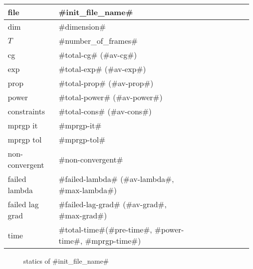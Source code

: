 \begin{center}
  \begin{tabular}{|l*{8}{|l}}
    \hline
	file & #init_file_name# \\ \hline
	dim & #dimension# \\ \hline
	$T$ & #number_of_frames# \\ \hline
	cg & #total-cg# (#av-cg#) \\ \hline
	exp & #total-exp# (#av-exp#) \\ \hline
	prop & #total-prop# (#av-prop#) \\ \hline
	power & #total-power# (#av-power#) \\ \hline
    constraints & #total-cons# (#av-cons#) \\ \hline
    mprgp it & #mprgp-it# \\ \hline
	mprgp tol & #mprgp-tol# \\ \hline
    non-convergent & #non-convergent# \\ \hline
    failed lambda & #failed-lambda# (#av-lambda#, #max-lambda#)\\ \hline
    failed lag grad & #failed-lag-grad# (#av-grad#, #max-grad#) \\ \hline
    time & #total-time#(#pre-time#, #power-time#, #mprgp-time#) \\ \hline
  \end{tabular}
\end{center}


\begin{figure}
  \centering
  \caption{statics of #init_file_name#}
  \label{en_f}
\end{figure}
